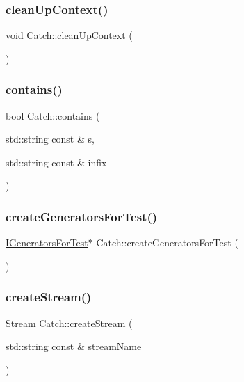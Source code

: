 \subsubsection{\texorpdfstring{clean\+Up\+Context()}{cleanUpContext()}}
{\footnotesize\ttfamily void Catch\+::clean\+Up\+Context (\begin{DoxyParamCaption}{ }\end{DoxyParamCaption})}

\mbox{\label{namespace_catch_aa52974b0e426e7e2fbd725a900e9c36e}} 
\subsubsection{\texorpdfstring{contains()}{contains()}}
{\footnotesize\ttfamily bool Catch\+::contains (\begin{DoxyParamCaption}\item[{std\+::string const \&}]{s,  }\item[{std\+::string const \&}]{infix }\end{DoxyParamCaption})}

\mbox{\label{namespace_catch_a3d93b31e88fd01ee9e0d20757ff64eab}} 
\subsubsection{\texorpdfstring{create\+Generators\+For\+Test()}{createGeneratorsForTest()}}
{\footnotesize\ttfamily \mbox{\hyperlink{struct_catch_1_1_i_generators_for_test}{I\+Generators\+For\+Test}}$\ast$ Catch\+::create\+Generators\+For\+Test (\begin{DoxyParamCaption}{ }\end{DoxyParamCaption})}

\mbox{\label{namespace_catch_ad7591011c5d99d59504ecd3384001c3e}} 
\subsubsection{\texorpdfstring{create\+Stream()}{createStream()}}
{\footnotesize\ttfamily Stream Catch\+::create\+Stream (\begin{DoxyParamCaption}\item[{std\+::string const \&}]{stream\+Name }\end{DoxyParamCaption})}

